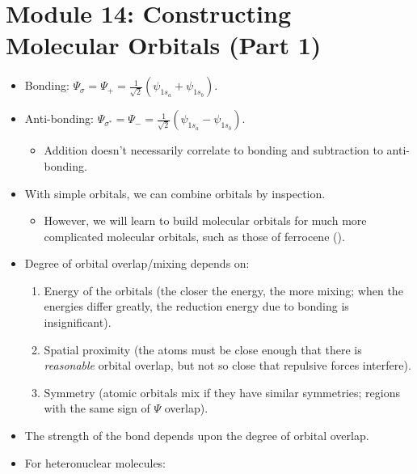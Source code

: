 \documentclass[../notes.tex]{subfiles}
\begin{document}
\section{Module 14: Constructing Molecular Orbitals (Part 1)}
\begin{itemize}
    \item Bonding: $\Psi_\sigma=\Psi_+=\frac{1}{\sqrt{2}}(\psi_{1s_a}+\psi_{1s_b})$.
    \item Anti-bonding: $\Psi_{\sigma^*}=\Psi_-=\frac{1}{\sqrt{2}}(\psi_{1s_a}-\psi_{1s_b})$.
    \begin{itemize}
        \item Addition doesn't necessarily correlate to bonding and subtraction to anti-bonding.
    \end{itemize}
    \item With simple orbitals, we can combine orbitals by inspection.
    \begin{itemize}
        \item However, we will learn to build molecular orbitals for much more complicated molecular orbitals, such as those of ferrocene ().
    \end{itemize}
    \item Degree of orbital overlap/mixing depends on:
    \begin{enumerate}
        \item Energy of the orbitals (the closer the energy, the more mixing; when the energies differ greatly, the reduction energy due to bonding is insignificant).
        \item Spatial proximity (the atoms must be close enough that there is \emph{reasonable} orbital overlap, but not so close that repulsive forces interfere).
        \item Symmetry (atomic orbitals mix if they have similar symmetries; regions with the same sign of $\Psi$ overlap).
    \end{enumerate}
    \item The strength of the bond depends upon the degree of orbital overlap.
    \item For heteronuclear molecules:
    \begin{figure}[h!]
        \centering
        \begin{subfigure}[b]{0.33\linewidth}
            \centering
\end{subfigure}
\end{figure}
\end{itemize}
\end{document}
